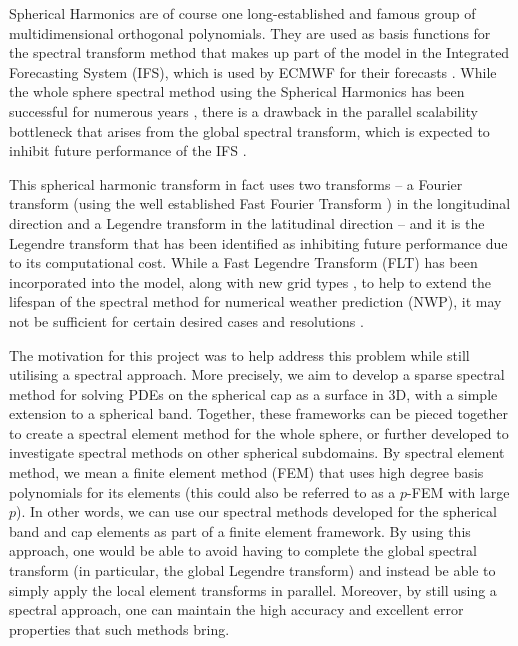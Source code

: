 Spherical Harmonics are of course one long-established and famous group of multidimensional orthogonal polynomials. They are used as basis functions for the spectral transform method that makes up part of the model in the Integrated Forecasting System (IFS), which is used by ECMWF for their forecasts \cite{wedi2013fast}. While the whole sphere spectral method using the Spherical Harmonics has been successful for numerous years \cite{williamson2007evolution}, there is a drawback in the parallel scalability bottleneck that arises from the global spectral transform, which is expected to inhibit future performance of the IFS \cite{ecmwf2020scalability, wedi2013fast, diamantakisecmwf}. 

This spherical harmonic transform in fact uses two transforms -- a Fourier transform (using the well established Fast Fourier Transform \cite{cooley1965algorithm}) in the longitudinal direction and a Legendre transform in the latitudinal direction -- and it is the Legendre transform that has been identified as inhibiting future performance due to its computational cost. While a Fast Legendre Transform (FLT) \cite{wedi2013fast} has been incorporated into the model, along with new grid types \cite{malardel2016new}, to help to extend the lifespan of the spectral method for numerical weather prediction (NWP), it may not be sufficient for certain desired cases and resolutions \cite{diamantakisecmwf}. 

The motivation for this project was to help address this problem while still utilising a spectral approach. More precisely, we aim to develop a sparse spectral method for solving PDEs on the spherical cap as a surface in 3D, with a simple extension to a spherical band. Together, these frameworks can be pieced together to create a spectral element method for the whole sphere, or further developed to investigate spectral methods on other spherical subdomains. By spectral element method, we mean a finite element method (FEM) that uses high degree basis polynomials for its elements (this could also be referred to as a $p$-FEM with large $p$). In other words, we can use our spectral methods developed for the spherical band and cap elements as part of a finite element framework. By using this approach, one would be able to avoid having to complete the global spectral transform (in particular, the global Legendre transform) and instead be able to simply apply the local element transforms in parallel. Moreover, by still using a spectral approach, one can maintain the high accuracy and excellent error properties that such methods bring.

